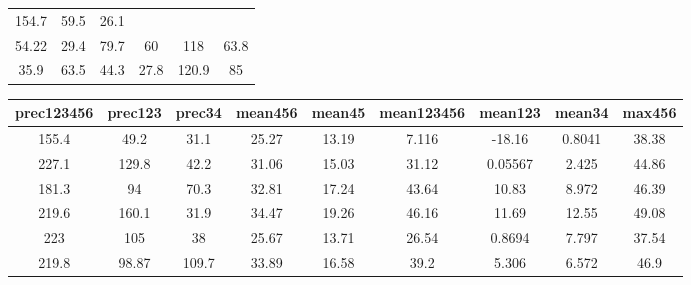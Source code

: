 \documentclass[10pt,]{article}
\begin{document}
\begin{longtable}[]{@{}cccccc@{}}
\begin{minipage}[t]{0.16\columnwidth}
154.7\strut
\end{minipage} & \begin{minipage}[t]{0.09\columnwidth}\centering\strut
59.5\strut
\end{minipage} & \begin{minipage}[t]{0.08\columnwidth}\centering\strut
26.1\strut
\end{minipage}\tabularnewline
\begin{minipage}[t]{0.16\columnwidth}\centering\strut
54.22\strut
\end{minipage} & \begin{minipage}[t]{0.16\columnwidth}\centering\strut
29.4\strut
\end{minipage} & \begin{minipage}[t]{0.16\columnwidth}\centering\strut
79.7\strut
\end{minipage} & \begin{minipage}[t]{0.16\columnwidth}\centering\strut
60\strut
\end{minipage} & \begin{minipage}[t]{0.09\columnwidth}\centering\strut
118\strut
\end{minipage} & \begin{minipage}[t]{0.08\columnwidth}\centering\strut
63.8\strut
\end{minipage}\tabularnewline
\begin{minipage}[t]{0.16\columnwidth}\centering\strut
35.9\strut
\end{minipage} & \begin{minipage}[t]{0.16\columnwidth}\centering\strut
63.5\strut
\end{minipage} & \begin{minipage}[t]{0.16\columnwidth}\centering\strut
44.3\strut
\end{minipage} & \begin{minipage}[t]{0.16\columnwidth}\centering\strut
27.8\strut
\end{minipage} & \begin{minipage}[t]{0.09\columnwidth}\centering\strut
120.9\strut
\end{minipage} & \begin{minipage}[t]{0.08\columnwidth}\centering\strut
85\strut
\end{minipage}\tabularnewline
\bottomrule
\end{longtable}

\begin{longtable}[]{@{}ccccccccc@{}}
\toprule
prec123456 & prec123 & prec34 & mean456 & mean45 & mean123456 & mean123
& mean34 & max456\tabularnewline
\midrule
\endhead
155.4 & 49.2 & 31.1 & 25.27 & 13.19 & 7.116 & -18.16 & 0.8041 &
38.38\tabularnewline
227.1 & 129.8 & 42.2 & 31.06 & 15.03 & 31.12 & 0.05567 & 2.425 &
44.86\tabularnewline
181.3 & 94 & 70.3 & 32.81 & 17.24 & 43.64 & 10.83 & 8.972 &
46.39\tabularnewline
219.6 & 160.1 & 31.9 & 34.47 & 19.26 & 46.16 & 11.69 & 12.55 &
49.08\tabularnewline
223 & 105 & 38 & 25.67 & 13.71 & 26.54 & 0.8694 & 7.797 &
37.54\tabularnewline
219.8 & 98.87 & 109.7 & 33.89 & 16.58 & 39.2 & 5.306 & 6.572 &
46.9\tabularnewline
\bottomrule
\end{longtable}
\end{document}
